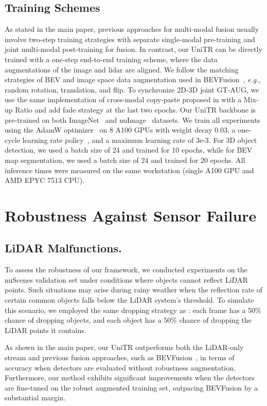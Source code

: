 \documentclass[10pt,twocolumn,letterpaper]{article}
\begin{document}
\subsection{Training Schemes} 
As stated in the main paper, previous approaches for multi-modal fusion usually involve two-step training strategies with separate single-modal pre-training and joint multi-modal post-training for fusion. In contrast, our UniTR can be directly trained with a one-step end-to-end training scheme, where the data augmentations of the image and lidar are aligned.  We follow the matching strategies of BEV and image space data augmentation used in BEVFusion~\cite{liu2022bevfusion}, \emph{e.g.}, random rotation, translation, and flip. To synchronize 2D-3D joint GT-AUG, we use the same implementation of cross-modal copy-paste proposed in \cite{chen2022autoalignv2} with a Mix-up Ratio  and add fade strategy at the last two epochs. Our UniTR backbone is pre-trained on both ImageNet~\cite{deng2009imagenet} and nuImage~\cite{caesar2020nuscenes} datasets.  We train all experiments using the AdamW optimizer~\cite{loshchilov2018decoupled} on 8 A100 GPUs with weight decay 0.03, a one-cycle learning rate policy~\cite{onecyc}, and a maximum learning rate of 3e-3. For 3D object detection, we used a batch size of 24 and trained for 10 epochs, while for BEV map segmentation, we used a batch size of 24 and trained for 20 epochs. All inference times were measured on the same workstation (single A100 GPU and AMD EPYC 7513 CPU).

\section{Robustness Against Sensor Failure} \label{sec:robust}
\subsection{LiDAR Malfunctions.} To assess the robustness of our framework, we conducted experiments on the nuScenes validation set under conditions where objects cannot reflect LiDAR points. Such situations may arise during rainy weather when the reflection rate of certain common objects falls below the LiDAR system's threshold. To simulate this scenario, we employed the same dropping strategy as \cite{liang2022bevfusion}: each frame has a 50\% chance of dropping objects, and each object has a 50\% chance of dropping the LiDAR points it contains.

As shown in the main paper, our UniTR outperforms both the LiDAR-only stream and previous fusion approaches, such as BEVFusion~\cite{liang2022bevfusion}, in terms of accuracy when detectors are evaluated without robustness augmentation. Furthermore, our method exhibits significant improvements when the detectors are fine-tuned on the robust augmented training set, outpacing BEVFusion by a substantial margin.
\end{document}
